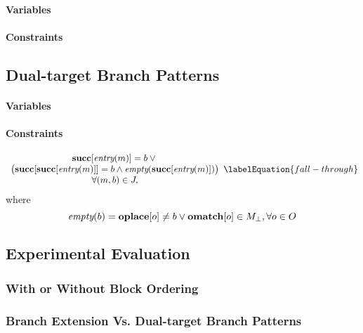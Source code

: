 \paragraph{Variables}

\paragraph{Constraints}

\subsection{Dual-target Branch Patterns}

\paragraph{Variables}

\paragraph{Constraints}

\begin{equation}
  \begin{array}{c}
    \mVar{succ}[\mEntry(m)] = b \mOr \mbox{} \\
    \big(
      \mVar{succ}[\mVar{succ}[\mEntry(m)]] = b
      \mAnd
      \mEmptyBlock(\mVar{succ}[\mEntry(m)])
    \big) \\
    \forall \mPair{m}{b} \in \mFallThroughSet,
  \end{array}
  \labelEquation{fall-through}
\end{equation}
%
where
%
\begin{equation*}
  \mEmptyBlock(b) =
  \mVar{oplace}[o] \neq b
  \mOr
  \mVar{omatch}[o] \in \mMatchSet[\mNull],
  \forall o \in \mOpSet
\end{equation*}


\subsection{Experimental Evaluation}
\subsubsection{With or Without Block Ordering}
\subsubsection{Branch Extension Vs. Dual-target Branch Patterns}

